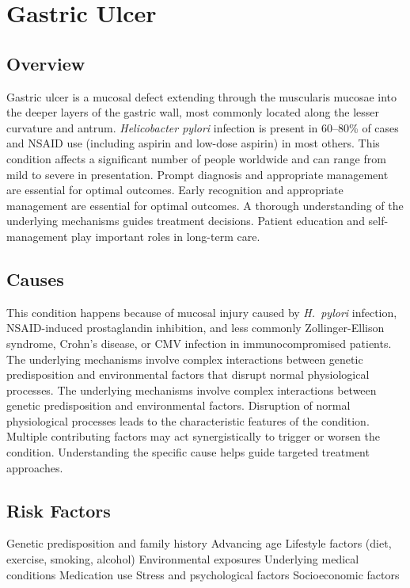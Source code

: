 \chapter{Gastric Ulcer}
\label{sec:Gastric Ulcer}

\section{Overview}
Gastric ulcer is a mucosal defect extending through the muscularis mucosae into the deeper layers of the gastric wall, most commonly located along the lesser curvature and antrum. \textit{Helicobacter pylori} infection is present in 60--80\% of cases and NSAID use (including aspirin and low-dose aspirin) in most others. This condition affects a significant number of people worldwide and can range from mild to severe in presentation. Prompt diagnosis and appropriate management are essential for optimal outcomes. Early recognition and appropriate management are essential for optimal outcomes. A thorough understanding of the underlying mechanisms guides treatment decisions. Patient education and self-management play important roles in long-term care.
\section{Causes}
This condition happens because of mucosal injury caused by \textit{H.~pylori} infection, NSAID-induced prostaglandin inhibition, and less commonly Zollinger-Ellison syndrome, Crohn's disease, or CMV infection in immunocompromised patients. The underlying mechanisms involve complex interactions between genetic predisposition and environmental factors that disrupt normal physiological processes. The underlying mechanisms involve complex interactions between genetic predisposition and environmental factors. Disruption of normal physiological processes leads to the characteristic features of the condition. Multiple contributing factors may act synergistically to trigger or worsen the condition. Understanding the specific cause helps guide targeted treatment approaches.
\section{Risk Factors}
Genetic predisposition and family history Advancing age Lifestyle factors (diet, exercise, smoking, alcohol) Environmental exposures Underlying medical conditions Medication use Stress and psychological factors Socioeconomic factors

